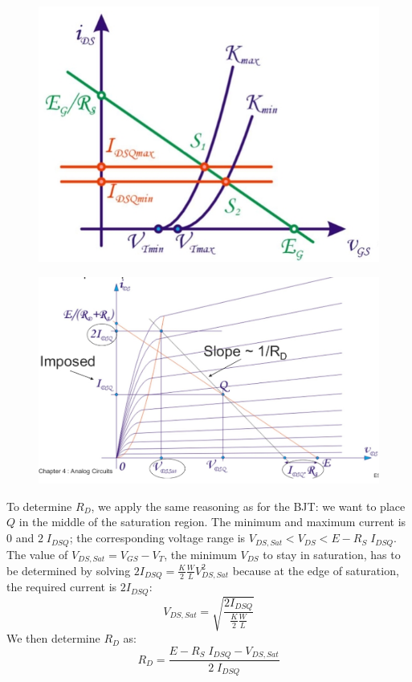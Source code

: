 \begin{figure}[h!]
\begin{minipage}{.5\textwidth}
	\centering
	\includegraphics[width=\textwidth]{figures/ch02/biasing4.jpg}
	\label{fig:biasing4}
\end{minipage}%
\begin{minipage}{.5\textwidth}
	\centering
	\includegraphics[width=\textwidth]{figures/ch02/biasing5.jpg}
	\label{fig:biasing5}
\end{minipage}
\end{figure}
To determine $R_D$, we apply the same reasoning as for the BJT: we want to place $Q$ in the middle of the saturation region. The minimum and maximum current is $0$ and $2\;I_{DSQ}$; the corresponding voltage range is $V_{DS,Sat} < V_{DS} < E - R_S\;I_{DSQ}$. The value of $V_{DS,Sat} = V_{GS} - V_T$, the minimum $V_{DS}$ to stay in saturation, has to be determined by solving $2 I_{DSQ} = \frac{K}{2} \frac{W}{L} V_{DS,Sat}^2$ because at the edge of saturation, the required current is $2 I_{DSQ}$:
$$
V_{DS,Sat} = \sqrt{\frac{2I_{DSQ}}{\frac{K}{2} \frac{W}{L}}}
$$
We then determine $R_D$ as:
\begin{equation}
	R_D = \frac{E - R_S\;I_{DSQ} - V_{DS,Sat}}{2\;I_{DSQ}}
\end{equation}
